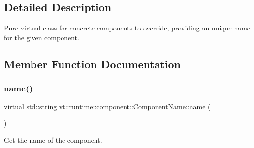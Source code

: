 \subsection{Detailed Description}
Pure virtual class for concrete components to override, providing an unique name for the given component. 

\subsection{Member Function Documentation}
\mbox{\label{structvt_1_1runtime_1_1component_1_1_component_name_a33c06229bb605a2b2ceff68830d6d773}} 
\subsubsection{\texorpdfstring{name()}{name()}}
{\footnotesize\ttfamily virtual std\+::string vt\+::runtime\+::component\+::\+Component\+Name\+::name (\begin{DoxyParamCaption}{ }\end{DoxyParamCaption})\hspace{0.3cm}{\ttfamily [pure virtual]}}



Get the name of the component. 



